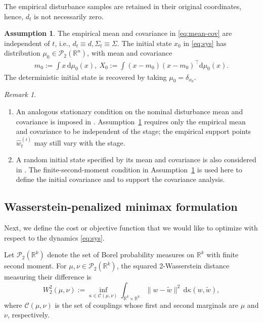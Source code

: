 \documentclass[10pt,journal,twoside]{IEEEtran}
\theoremstyle{definition}
\newtheorem{assumption}{Assumption}
\theoremstyle{remark}
\newtheorem{remark}{Remark}
\newcommand{\dd}{\mathrm{d}}
\begin{document}
The empirical disturbance samples are retained in their original coordinates, hence,  \(d_t\) is not necessarily zero.





\begin{assumption}
	\label{ass:stationary-empirical}
	The empirical mean and covariance in \eqref{eq:mean-cov} are independent of \(t\), i.e.,
	 $d_t\equiv d,
		\Sigma_t\equiv\Sigma$. The initial state $x_0$ in \eqref{eq:sys} has distribution \(\mu_0\in\mathcal P_2(\mathbb R^n)\), with mean and
	covariance
	\begin{equation}
		\begin{aligned}
			m_0:=\!\!\int \!x\,\dd\mu_0(x),
			~X_0\!:=\!\!\int \!(x-m_0)(x-m_0)^\top\dd\mu_0(x).
		\end{aligned}
		\label{eq:initial-ensemble-moments}
	\end{equation}
	The deterministic initial state is recovered by taking
	\(\mu_0=\delta_{x_0}\).
\end{assumption}

\begingroup
\begin{remark}
\begin{enumerate}
    \item An analogous stationary condition on the nominal disturbance mean and
	covariance is imposed in \cite{HakobyanYang2024}. Assumption~\ref{ass:stationary-empirical}
	requires only the empirical mean and covariance to be independent of the
	stage; the empirical support points $\widehat w_t^{(i)}$ may still vary with the stage.
    \item A random initial state specified by its mean and covariance is also
	considered in \cite{HakobyanYang2024}. The finite-second-moment condition in
	Assumption~\ref{ass:stationary-empirical} is used here to define the initial
	covariance and to support the covariance analysis.
\end{enumerate}
\end{remark}
\endgroup


\subsection{Wasserstein-penalized minimax formulation}
\label{subsec:minimax-formulation}

Next, we define the cost or objective function that we would like to optimize with respect to the dynamics \eqref{eq:sys}. 

Let \(\mathcal P_2(\mathbb R^k)\) denote the set of Borel probability
measures on \(\mathbb R^k\) with finite second moment.  For
\(\mu,\nu\in\mathcal P_2(\mathbb R^k)\), the squared 2-Wasserstein distance measuring their difference is
\begin{equation}
	W_2^2(\mu,\nu)
	:=
	\inf_{\kappa\in\mathcal C(\mu,\nu)}
	\int_{\mathbb R^k\times\mathbb R^k}
	\|w-\widetilde w\|^2
	\,\dd\kappa(w,\widetilde w),
	\label{eq:W2-def}
\end{equation}
where \(\mathcal C(\mu,\nu)\) is the set of couplings whose first and second
marginals are \(\mu\) and \(\nu\), respectively.
\end{document}
